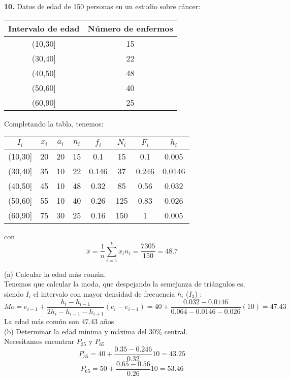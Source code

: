 \documentclass[a4paper,12pt]{article}
\begin{document}
\vspace{0.5cm}
\textbf{10.} Datos de edad de 150 personas en un estudio sobre cáncer:

\begin{center}
    \begin{tabular}{c|c}
        Intervalo de edad & Número de enfermos \\
        \hline
        (10,30] & 15 \\
        (30,40] & 22 \\
        (40,50] & 48 \\
        (50,60] & 40 \\
        (60,90] & 25 \\
    \end{tabular}
\end{center}
Completando la tabla, tenemos:
\begin{center}
    \begin{tabular}{c|c|c|c|c|c|c|c}
        $I_i$ & $x_i$ & $a_i$ & $n_i$ & $f_i$ & $N_i$ & $F_i$ & $h_i$\\
        \hline
        (10,30] & 20 & 20 & 15 & 0.1 & 15 & 0.1 & 0.005\\
        (30,40] & 35 & 10 & 22 & 0.146 & 37 & 0.246 & 0.0146\\
        (40,50] & 45 & 10 & 48 & 0.32 & 85 & 0.56 & 0.032\\
        (50,60] & 55 & 10 & 40 & 0.26 & 125 & 0.83 & 0.026\\
        (60,90] & 75 & 30 & 25 & 0.16 & 150 & 1 & 0.005\\
    \end{tabular}
\end{center}
con 
$$\bar x = \frac {1}{n} \sum\limits_{i = 1}^k {x_i n_i} = \frac{7305}{150} = 48.7 $$

(a) Calcular la edad más común.\\
Tenemos que calcular la moda, que despejando la semejanza de triángulos es, siendo $I_i$ el intervalo con mayor densidad de frecuencia $h_i$ ($I_3$) :
$$Mo = e_{i-1} + \frac{h_i - h_{i-1}}{2h_i - h_{i-1} - h_{i+1} }(e_i -e_{i-1}) = 40 + \frac{0.032-0.0146}{0.064-0.0146-0.026}(10) = 47.43$$
La edad más común son 47.43 años\\

(b) Determinar la edad mínima y máxima del 30\% central.\\
Necesitamos encontrar $P_{35}$ y $P_{65}$
$$P_{35} = 40 + \frac{0.35-0.246}{0.32} 10 = 43.25$$
$$P_{65} = 50 + \frac{0.65-0.56}{0.26} 10 = 53.46$$
\end{document}
